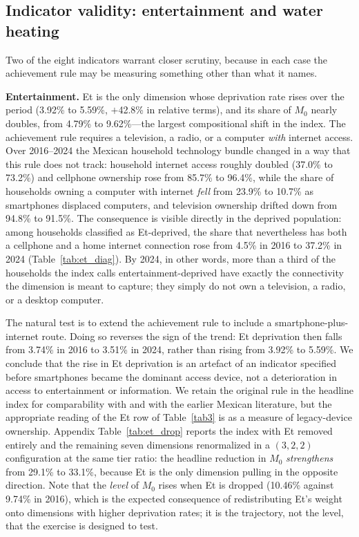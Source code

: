 \documentclass[11pt, a4paper]{article}
\begin{document}
\FloatBarrier

\subsection{Indicator validity: entertainment and water heating}\label{sec:indicator}

Two of the eight indicators warrant closer scrutiny, because in each case the achievement rule may be measuring something other than what it names.

\textbf{Entertainment.} Et is the only dimension whose deprivation rate rises over the period (3.92\% to 5.59\%, $+$42.8\% in relative terms), and its share of $M_0$ nearly doubles, from 4.79\% to 9.62\%---the largest compositional shift in the index. The achievement rule requires a television, a radio, or a computer \emph{with} internet access. Over 2016--2024 the Mexican household technology bundle changed in a way that this rule does not track: household internet access roughly doubled (37.0\% to 73.2\%) and cellphone ownership rose from 85.7\% to 96.4\%, while the share of households owning a computer with internet \emph{fell} from 23.9\% to 10.7\% as smartphones displaced computers, and television ownership drifted down from 94.8\% to 91.5\%. The consequence is visible directly in the deprived population: among households classified as Et-deprived, the share that nevertheless has both a cellphone and a home internet connection rose from 4.5\% in 2016 to 37.2\% in 2024 (Table~\ref{tab:et_diag}). By 2024, in other words, more than a third of the households the index calls entertainment-deprived have exactly the connectivity the dimension is meant to capture; they simply do not own a television, a radio, or a desktop computer.

The natural test is to extend the achievement rule to include a smartphone-plus-internet route. Doing so reverses the sign of the trend: Et deprivation then falls from 3.74\% in 2016 to 3.51\% in 2024, rather than rising from 3.92\% to 5.59\%. We conclude that the rise in Et deprivation is an artefact of an indicator specified before smartphones became the dominant access device, not a deterioration in access to entertainment or information. We retain the original rule in the headline index for comparability with \textcite{nussbaumer2012} and with the earlier Mexican literature, but the appropriate reading of the Et row of Table~\ref{tab3} is as a measure of legacy-device ownership. Appendix Table~\ref{tab:et_drop} reports the index with Et removed entirely and the remaining seven dimensions renormalized in a $(3,2,2)$ configuration at the same tier ratio: the headline reduction in $M_0$ \emph{strengthens} from 29.1\% to 33.1\%, because Et is the only dimension pulling in the opposite direction. Note that the \emph{level} of $M_0$ rises when Et is dropped (10.46\% against 9.74\% in 2016), which is the expected consequence of redistributing Et's weight onto dimensions with higher deprivation rates; it is the trajectory, not the level, that the exercise is designed to test.
\end{document}
